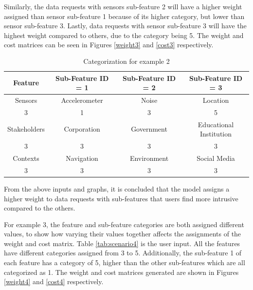 Similarly, the data requests with sensors sub-feature 2 will have a higher weight assigned than sensor sub-feature 1 because of its higher category, but lower than sensor sub-feature 3. Lastly, data requests with sensor sub-feature 3 will have the highest weight compared to others, due to the category being 5. The weight and cost matrices can be seen in Figures \ref{weight3} and \ref{cost3} respectively.

\begin{table}[h!]
  \centering
  \caption{Categorization for example 2}
  \label{tab:scenario3}
  \begin{tabular}{cccc}
    \toprule
    Feature & Sub-Feature ID = 1 & Sub-Feature ID = 2 & Sub-Feature ID = 3\\
    \midrule
    Sensors & Accelerometer & Noise & Location\\
     3 & 1 & 3 & 5\\ \hhline{====}
     Stakeholders & Corporation & Government & Educational Institution\\
     3 & 3 & 3 & 3\\ \hhline{====}
     Contexts & Navigation & Environment & Social Media\\
     3 & 3 & 3 & 3\\ 
    \bottomrule
  \end{tabular}
\end{table}

% 


%


From the above inputs and graphs, it is concluded that the model assigns a higher weight to data requests with sub-features that users find more intrusive compared to the others.

For example 3, the feature and sub-feature categories are both assigned different values, to show how varying their values together affects the assignments of the weight and cost matrix. Table \ref{tab:scenario4} is the user input. All the features have different categories assigned from 3 to 5. Additionally, the sub-feature 1 of each feature has a category of 5, higher than the other sub-features which are all categorized as 1. The weight and cost matrices generated are shown in Figures \ref{weight4} and \ref{cost4} respectively. 

